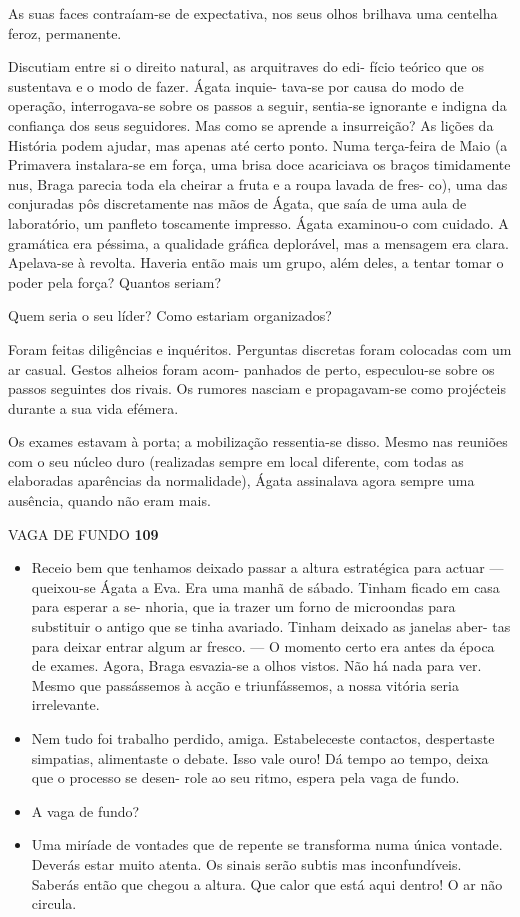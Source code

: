 As suas faces contraíam-se de expectativa, nos seus olhos brilhava uma
centelha feroz, permanente.

Discutiam entre si o direito natural, as arquitraves do edi- fício
teórico que os sustentava e o modo de fazer. Ágata inquie- tava-se por
causa do modo de operação, interrogava-se sobre os passos a seguir,
sentia-se ignorante e indigna da confiança dos seus seguidores. Mas como
se aprende a insurreição? As lições da História podem ajudar, mas apenas
até certo ponto. Numa terça-feira de Maio (a Primavera instalara-se em
força, uma brisa doce acariciava os braços timidamente nus, Braga
parecia toda ela cheirar a fruta e a roupa lavada de fres- co), uma das
conjuradas pôs discretamente nas mãos de Ágata, que saía de uma aula de
laboratório, um panfleto toscamente impresso. Ágata examinou-o com
cuidado. A gramática era péssima, a qualidade gráfica deplorável, mas a
mensagem era clara. Apelava-se à revolta. Haveria então mais um grupo,
além deles, a tentar tomar o poder pela força? Quantos seriam?

Quem seria o seu líder? Como estariam organizados?

Foram feitas diligências e inquéritos. Perguntas discretas foram
colocadas com um ar casual. Gestos alheios foram acom- panhados de
perto, especulou-se sobre os passos seguintes dos rivais. Os rumores
nasciam e propagavam-se como projécteis durante a sua vida efémera.

Os exames estavam à porta; a mobilização ressentia-se disso. Mesmo nas
reuniões com o seu núcleo duro (realizadas sempre em local diferente,
com todas as elaboradas aparências da normalidade), Ágata assinalava
agora sempre uma ausência, quando não eram mais.

VAGA DE FUNDO \textbf{109}

\begin{itemize}
\tightlist
\item
  Receio bem que tenhamos deixado passar a altura estratégica para
  actuar --- queixou-se Ágata a Eva. Era uma manhã de sábado. Tinham
  ficado em casa para esperar a se- nhoria, que ia trazer um forno de
  microondas para substituir o antigo que se tinha avariado. Tinham
  deixado as janelas aber- tas para deixar entrar algum ar fresco. --- O
  momento certo era antes da época de exames. Agora, Braga esvazia-se a
  olhos vistos. Não há nada para ver. Mesmo que passássemos à acção e
  triunfássemos, a nossa vitória seria irrelevante.
\item
  Nem tudo foi trabalho perdido, amiga. Estabeleceste contactos,
  despertaste simpatias, alimentaste o debate. Isso vale ouro! Dá tempo
  ao tempo, deixa que o processo se desen- role ao seu ritmo, espera
  pela vaga de fundo.
\item
  A vaga de fundo?
\item
  Uma miríade de vontades que de repente se transforma numa única
  vontade. Deverás estar muito atenta. Os sinais serão subtis mas
  inconfundíveis. Saberás então que chegou a altura. Que calor que está
  aqui dentro! O ar não circula.
\end{itemize}


